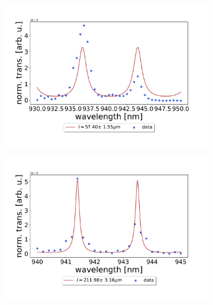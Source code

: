 \begin{figure}[h!]
    \centering
    \begin{subfigure}[b]{0.49\textwidth}
        \centering
        \includegraphics[width=\textwidth]{figures/results/60um_M5_FSR_fit.pdf}
        \caption{}
        \label{fig:short_single_fano_FSR}
    \end{subfigure}
    \begin{subfigure}[b]{0.49\textwidth}
        \centering
        \includegraphics[width=\textwidth]{figures/results/220um_M5_FSR_fit.pdf}
        \caption{}
        \label{fig:long_single_fano_FSR}
    \end{subfigure}
\end{figure}

